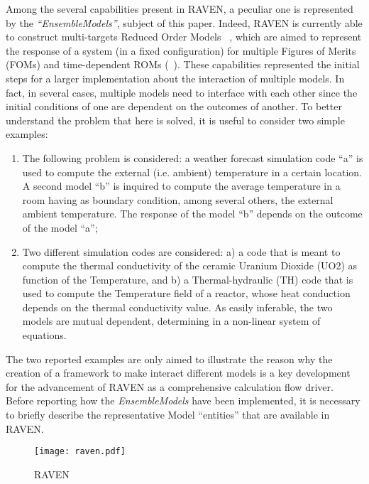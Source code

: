 Among the several capabilities present in RAVEN, a peculiar one is represented by the \textit{``EnsembleModels''}, subject of this paper.
Indeed, RAVEN is currently able to construct multi-targets Reduced Order Models ~\cite{MultiTarget}, which are aimed to represent the response of a system (in a 
fixed configuration) for multiple Figures of Merits (FOMs) and time-dependent ROMs (~\cite{TimeDependentROM}). These capabilities represented the initial steps 
for a larger implementation about the interaction of multiple models. In fact, in several cases, multiple models need to interface with each other since the initial 
conditions of one are dependent on the outcomes of another.
To better understand the problem that here is solved, it is useful to consider two simple examples:
\begin{enumerate}
  \item The following problem is considered: a weather forecast simulation code ``a'' is used to compute the external (i.e. ambient) temperature in a certain location. 
  A second model ``b'' is inquired to compute the average temperature in a room having as boundary condition, among several others, the external ambient 
  temperature. The response of the model ``b'' depends on the outcome of the model ``a'';
   \item Two different simulation codes are considered: a) a code that is meant to compute the thermal conductivity of the ceramic Uranium Dioxide (UO2) as 
   function of the Temperature, and b) a Thermal-hydraulic (TH) code that is used to compute the Temperature field of a reactor, whose heat conduction depends on 
   the thermal conductivity value. As easily inferable, the two models are mutual dependent, determining in a non-linear system of equations.
\end{enumerate}
The two reported examples are only aimed to illustrate the reason why the creation of a framework to make interact different models is a key development for the 
advancement of RAVEN as a comprehensive calculation flow driver. Before reporting how the \textit{EnsembleModels} have been implemented, it is necessary to briefly 
describe the representative Model ``entities'' that are available in RAVEN.



\begin{figure}
    \centering
    \texttt{[image: raven.pdf]}
    \caption{RAVEN}
    \label{fig:raven}
\end{figure}
